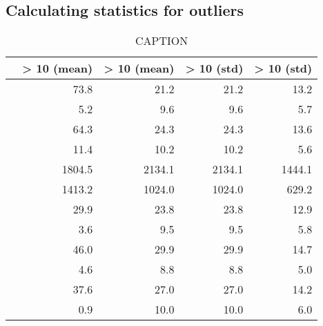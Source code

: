 \subsection{Calculating statistics for outliers}

\begin{table}
	 \centering
	 \begin{tabular}{lrrrr}
	\toprule
	{} &  \overshoot > 10 (mean) &  \overshoot > 10 (mean) &  \overshoot > 10 (std) &  \overshoot > 10 (std) \\
	\midrule
	\sclatencymu                &                    73.8 &                    21.2 &                   21.2 &                   13.2 \\
	\sclatencys                 &                     5.2 &                     9.6 &                    9.6 &                    5.7 \\
	\scthinkmu                  &                    64.3 &                    24.3 &                   24.3 &                   13.6 \\
	\scthinks                   &                    11.4 &                    10.2 &                   10.2 &                    5.6 \\
	\sctimehorizonmu            &                  1804.5 &                  2134.1 &                 2134.1 &                 1444.1 \\
	\sctimehorizons             &                  1413.2 &                  1024.0 &                 1024.0 &                  629.2 \\
	\scwaitTimeBetweenTradingmu &                    29.9 &                    23.8 &                   23.8 &                   12.9 \\
	\scwaitTimeBetweenTradings  &                     3.6 &                     9.5 &                    9.5 &                    5.8 \\
	\ssmmlatencymu              &                    46.0 &                    29.9 &                   29.9 &                   14.7 \\
	\ssmmlatencys               &                     4.6 &                     8.8 &                    8.8 &                    5.0 \\
	\ssmmthinkmu                &                    37.6 &                    27.0 &                   27.0 &                   14.2 \\
	\ssmmthinks                 &                     0.9 &                    10.0 &                   10.0 &                    6.0 \\
	\bottomrule
	\end{tabular}
	\label{LABEL}
	\caption{CAPTION}
\end{table}
